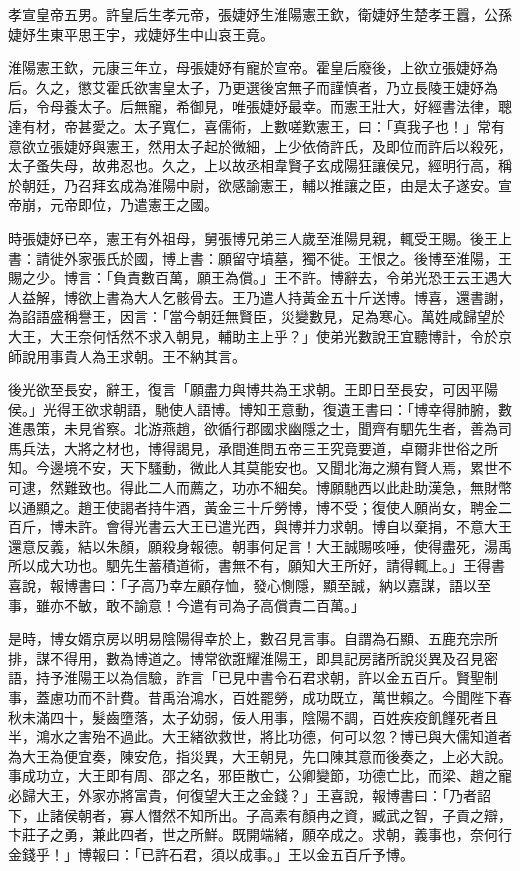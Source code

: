 
\begin{pinyinscope}
孝宣皇帝五男。許皇后生孝元帝，張婕妤生淮陽憲王欽，衛婕妤生楚孝王囂，公孫婕妤生東平思王宇，戎婕妤生中山哀王竟。

淮陽憲王欽，元康三年立，母張婕妤有寵於宣帝。霍皇后廢後，上欲立張婕妤為后。久之，懲艾霍氏欲害皇太子，乃更選後宮無子而謹慎者，乃立長陵王婕妤為后，令母養太子。后無寵，希御見，唯張婕妤最幸。而憲王壯大，好經書法律，聰達有材，帝甚愛之。太子寬仁，喜儒術，上數嗟歎憲王，曰：「真我子也！」常有意欲立張婕妤與憲王，然用太子起於微細，上少依倚許氏，及即位而許后以殺死，太子蚤失母，故弗忍也。久之，上以故丞相韋賢子玄成陽狂讓侯兄，經明行高，稱於朝廷，乃召拜玄成為淮陽中尉，欲感諭憲王，輔以推讓之臣，由是太子遂安。宣帝崩，元帝即位，乃遣憲王之國。

時張婕妤已卒，憲王有外祖母，舅張博兄弟三人歲至淮陽見親，輒受王賜。後王上書：請徙外家張氏於國，博上書：願留守墳墓，獨不徙。王恨之。後博至淮陽，王賜之少。博言：「負責數百萬，願王為償。」王不許。博辭去，令弟光恐王云王遇大人益解，博欲上書為大人乞骸骨去。王乃遣人持黃金五十斤送博。博喜，還書謝，為諂語盛稱譽王，因言：「當今朝廷無賢臣，災變數見，足為寒心。萬姓咸歸望於大王，大王奈何恬然不求入朝見，輔助主上乎？」使弟光數說王宜聽博計，令於京師說用事貴人為王求朝。王不納其言。

後光欲至長安，辭王，復言「願盡力與博共為王求朝。王即日至長安，可因平陽侯。」光得王欲求朝語，馳使人語博。博知王意動，復遺王書曰：「博幸得肺腑，數進愚策，未見省察。北游燕趙，欲循行郡國求幽隱之士，聞齊有駟先生者，善為司馬兵法，大將之材也，博得謁見，承間進問五帝三王究竟要道，卓爾非世俗之所知。今邊境不安，天下騷動，微此人其莫能安也。又聞北海之瀕有賢人焉，累世不可逮，然難致也。得此二人而薦之，功亦不細矣。博願馳西以此赴助漢急，無財幣以通顯之。趙王使謁者持牛酒，黃金三十斤勞博，博不受；復使人願尚女，聘金二百斤，博未許。會得光書云大王已遣光西，與博并力求朝。博自以棄捐，不意大王還意反義，結以朱顏，願殺身報德。朝事何足言！大王誠賜咳唾，使得盡死，湯禹所以成大功也。駟先生蓄積道術，書無不有，願知大王所好，請得輒上。」王得書喜說，報博書曰：「子高乃幸左顧存恤，發心惻隱，顯至誠，納以嘉謀，語以至事，雖亦不敏，敢不諭意！今遣有司為子高償責二百萬。」

是時，博女婿京房以明易陰陽得幸於上，數召見言事。自謂為石顯、五鹿充宗所排，謀不得用，數為博道之。博常欲誑耀淮陽王，即具記房諸所說災異及召見密語，持予淮陽王以為信驗，詐言「已見中書令石君求朝，許以金五百斤。賢聖制事，蓋慮功而不計費。昔禹治鴻水，百姓罷勞，成功既立，萬世賴之。今聞陛下春秋未滿四十，髮齒墮落，太子幼弱，佞人用事，陰陽不調，百姓疾疫飢饉死者且半，鴻水之害殆不過此。大王緒欲救世，將比功德，何可以忽？博已與大儒知道者為大王為便宜奏，陳安危，指災異，大王朝見，先口陳其意而後奏之，上必大說。事成功立，大王即有周、邵之名，邪臣散亡，公卿變節，功德亡比，而梁、趙之寵必歸大王，外家亦將富貴，何復望大王之金錢？」王喜說，報博書曰：「乃者詔下，止諸侯朝者，寡人憯然不知所出。子高素有顏冉之資，臧武之智，子貢之辯，卞莊子之勇，兼此四者，世之所鮮。既開端緒，願卒成之。求朝，義事也，奈何行金錢乎！」博報曰：「已許石君，須以成事。」王以金五百斤予博。


\end{pinyinscope}
